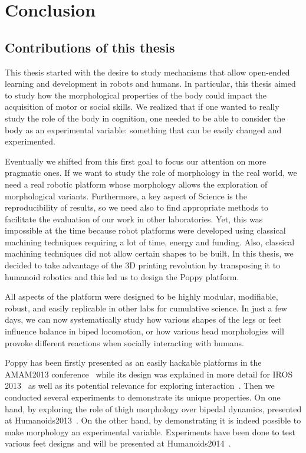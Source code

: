 
\chapter{Conclusion} %
\label{cha:conclusion}


\section{Contributions of this thesis} %
\label{sec:rappel_des_contributions}

This thesis started with the desire to study mechanisms that allow open-ended learning and development in robots and humans. In particular, this thesis aimed to study how the morphological properties of the body could impact the acquisition of motor or social skills.
We realized that if one wanted to really study the role of the body in cognition, one needed to be able to consider the body as an experimental variable: something that can be easily changed and experimented.

Eventually we shifted from this first goal to focus our attention on more pragmatic ones. If we want to study the role of morphology in the real world, we need a real robotic platform whose morphology allows the exploration of morphological variants. Furthermore, a key aspect of Science is the reproducibility of results, so we need also to find appropriate methods to facilitate the evaluation of our work in other laboratories.
Yet, this was impossible at the time because robot platforms were developed using classical machining techniques requiring a lot of time, energy and funding. Also, classical machining techniques did not allow certain shapes to be built. In this thesis, we decided to take advantage of the 3D printing revolution by transposing it to humanoid robotics and this led us to design the Poppy platform.

All aspects of the platform were designed to be highly modular, modifiable, robust, and easily replicable in other labs for cumulative science. In just a few days, we can now systematically study how various shapes of the legs or feet influence balance in biped locomotion, or how various head morphologies will provoke different reactions when socially interacting with humans.

Poppy has been firstly presented as an easily hackable platforms in the AMAM2013 conference~\parencite{REF} while its design was explained in more detail for IROS 2013~\parencite{REF} as well as its potential relevance for exploring interaction~\parencite{REF}. Then we conducted several experiments to demonstrate its unique properties. On one hand, by exploring the role of thigh morphology over bipedal dynamics, presented at Humanoids2013~\parencite{REF}. On the other hand, by demonstrating it is indeed possible to make morphology an experimental variable. Experiments have been done to test various feet designs and will be presented at Humanoids2014~\parencite{REF}.

